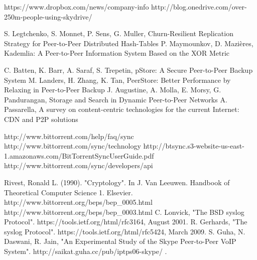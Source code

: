 \documentclass[12pt]{report}
\begin{document}
\begin{thebibliography}{11}

 https://www.dropbox.com/news/company-info
 http://blog.onedrive.com/over-250m-people-using-skydrive/
    
 S. Legtchenko, S. Monnet, P. Sens, G. Muller, Churn-Resilient Replication Strategy for Peer-to-Peer Distributed Hash-Tables
 P. Maymounkov, D. Mazi\`eres, Kademlia: A Peer-to-Peer Information System Based on the XOR Metric

 C. Batten, K. Barr, A. Saraf, S. Trepetin, pStore: A Secure Peer-to-Peer Backup System
 M. Landers, H. Zhang, K. Tan, PeerStore: Better Performance by Relaxing in Peer-to-Peer Backup
 J. Augustine, A. Molla, E. Morsy, G. Pandurangan, Storage and Search in Dynamic Peer-to-Peer Networks
 A. Passarella, A survey on content-centric technologies for the current Internet: CDN and P2P solutions

 http://www.bittorrent.com/help/faq/sync
 http://www.bittorrent.com/sync/technology
 http://btsync.s3-website-us-east-1.amazonaws.com/BitTorrentSyncUserGuide.pdf
 http://www.bittorrent.com/sync/developers/api

 Rivest, Ronald L. (1990). "Cryptology". In J. Van Leeuwen. Handbook of Theoretical Computer Science 1. Elsevier.
 http://www.bittorrent.org/beps/bep\_0005.html
 http://www.bittorrent.org/beps/bep\_0003.html
 C. Lonvick, "The BSD syslog Protocol". https://tools.ietf.org/html/rfc3164, August 2001.
 R. Gerhards, "The syslog Protocol". https://tools.ietf.org/html/rfc5424, March 2009.
 S. Guha, N. Daswani, R. Jain, "An Experimental Study of the Skype Peer-to-Peer VoIP System". http://saikat.guha.cc/pub/iptps06-skype/ .

\end{thebibliography}
\end{document}
